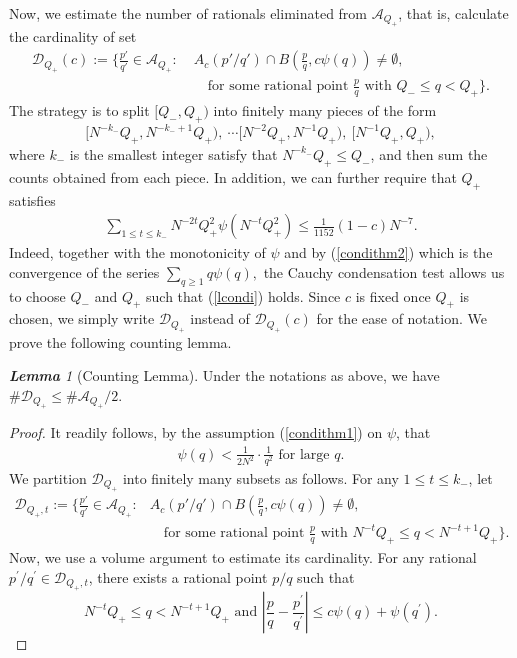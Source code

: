 \documentclass[11pt]{amsart}
\numberwithin{equation}{section}
\newcommand{\0}{\mathbf{0}}
\theoremstyle{remark}
\newtheorem{lem}{\bf Lemma}[section]
\begin{document}
{Now, we estimate the number of rationals eliminated from $\mathcal{A}_{Q_+}$, that is, calculate the cardinality of set
\begin{align*}
\mathcal{D}_{Q_+}(c) := \Bigg\{ \frac{p'}{q'} \in \mathcal{A}_{Q_+} :\; & A_{c}(p'/q') \cap B\left(\frac{p}{q}, c\psi(q)\right) \neq \emptyset, \\
& \quad \text{for some rational point } \frac{p}{q} \text{ with } Q_-\le q < Q_+ \Bigg\}.
\end{align*}
The strategy is to split $[Q_-,Q_+)$ into finitely many pieces of the form
$$[N^{-k_-}Q_+,N^{-k_-+1}Q_+),\ \cdots [N^{-2}Q_+,N^{-1}Q_+),\ [N^{-1}Q_+,Q_+),$$
where $k_-$ is the smallest integer satisfy that $N^{-k_-}Q_+\le Q_-$, and then sum the counts obtained from each piece. In addition, we can further require that $Q_+$ satisfies
 \begin{align}\label{lcondi}
    \sum_{1\le t\le k_-}N^{-2t}Q_+^2\psi(N^{-t}Q_+^2)\le \frac{1}{1152}(1-c)N^{-7}.
    \end{align}
     Indeed, together with the monotonicity of $\psi$ and by (\ref{condithm2}) which is the convergence of the series 
     $\sum_{q\ge 1}q\psi(q),$ 
     the Cauchy condensation test allows us to choose $Q_-$ and $Q_+$ such that (\ref{lcondi}) holds. Since $c$ is fixed once $Q_+$ is chosen, we simply write $\mathcal{D}_{Q_+}$ instead of $\mathcal{D}_{Q_+}(c)$ for the ease of notation.  We prove the following counting lemma.
\begin{lem}[Counting Lemma]\label{count}
    Under the notations as above, we have $\#\mathcal{D}_{Q_+}\le \#\mathcal{A}_{Q_+} / 2$.
\end{lem}
\begin{proof}\label{trequire}
    It readily follows, by the assumption {(\ref{condithm1})} on $\psi$, that
    \begin{align}\label{psicondi}
    \psi(q)<\frac{1}{2N^2}\cdot\frac{1}{q^2}\text{ for large }q.
    \end{align}
     We partition $\mathcal{D}_{Q_+}$ into finitely many subsets as follows. For any $1\le t\le k_-$, let
     \begin{align*}
\mathcal{D}_{Q_+,t}:= \Bigg\{ \frac{p'}{q'} \in \mathcal{A}_{Q_+} : & A_{c}(p'/q') \cap B\left(\frac{p}{q}, c\psi(q)\right) \neq \emptyset, \\
& \quad \text{for some rational point } \frac{p}{q} \text{ with } N^{-t}Q_+\le q< N^{-t+1}Q_+ \Bigg\}.
\end{align*}
Now, we use a volume argument to estimate its cardinality. For any rational $p^{\prime}/q^{\prime}\in\mathcal{D}_{Q_+,t}$, there exists a rational point $p/q$ such that $$ N^{-t}Q_+\le q<N^{-t+1}Q_+ \textrm{ and } \left|\frac{p}{q}-\frac{p^{\prime}}{q^{\prime}}\right|\le c\psi(q)+\psi(q^{\prime}).$$

\end{proof}}
\end{document}
